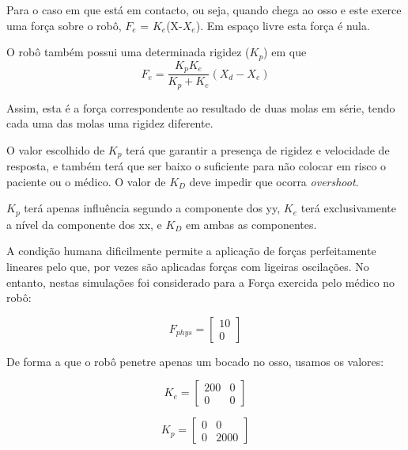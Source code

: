\documentclass[a4paper,twocolumn,final,11pt]{article}
\begin{document}
Para o caso em que está em contacto, ou seja, quando chega ao osso e este exerce uma força sobre o robô, $F_e$ =
$K_e$(X-$X_e$). Em espaço livre esta força é nula.

O robô também possui uma determinada rigidez ($K_p$) em que 
\begin{equation}
    F_e = \frac{K_p K_e}{K_p + K_e}(X_d - X_e)
\end{equation}

Assim, esta é a força correspondente ao resultado de duas molas em série, tendo cada uma das molas uma rigidez diferente.

O valor escolhido de $K_p$ terá que garantir a presença de rigidez e velocidade de resposta, e também terá que ser baixo o suficiente para não colocar em risco o paciente ou o médico. 
O valor de $K_D$ deve impedir que ocorra \textit{overshoot}.

$K_p$ terá apenas influência segundo a componente dos yy, $K_e$ terá exclusivamente a nível da componente dos xx, e $K_D$ em ambas as componentes.

A condição humana dificilmente permite a aplicação de forças perfeitamente lineares pelo que, por vezes são aplicadas forças com ligeiras oscilações.
No entanto, nestas simulações foi considerado para a Força exercida pelo médico no robô:

\begin{equation}
F_{phys} =
    \begin{bmatrix}
    10 \\
    0
    \end{bmatrix}
\end{equation}

\linebreak

De forma a que o robô penetre apenas um bocado no osso, usamos os valores:

\begin{equation}
K_e =
    \begin{bmatrix}
    200 & 0 \\
    0 & 0
    \end{bmatrix}
\end{equation}

\begin{equation}
K_p =
    \begin{bmatrix}
    0 & 0 \\
    0 & 2000
    \end{bmatrix}
\end{equation}
\end{document}
